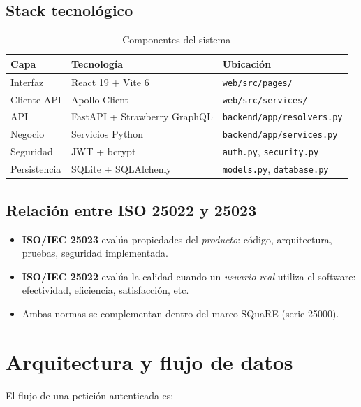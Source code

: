 \documentclass[11pt,a4paper]{article}
\begin{document}
\subsection{Stack tecnológico}
\begin{table}[h]
  \centering
  \caption{Componentes del sistema}
  \begin{tabular}{@{}lll@{}}
    \toprule
    \textbf{Capa} & \textbf{Tecnología} & \textbf{Ubicación} \\
    \midrule
    Interfaz & React 19 + Vite 6 & \texttt{web/src/pages/} \\
    Cliente API & Apollo Client & \texttt{web/src/services/} \\
    API & FastAPI + Strawberry GraphQL & \texttt{backend/app/resolvers.py} \\
    Negocio & Servicios Python & \texttt{backend/app/services.py} \\
    Seguridad & JWT + bcrypt & \texttt{auth.py}, \texttt{security.py} \\
    Persistencia & SQLite + SQLAlchemy & \texttt{models.py}, \texttt{database.py} \\
    \bottomrule
  \end{tabular}
\end{table}

\subsection{Relación entre ISO 25022 y 25023}
\begin{itemize}[noitemsep]
  \item \textbf{ISO/IEC 25023} evalúa propiedades del \emph{producto}: código, arquitectura, pruebas, seguridad implementada.
  \item \textbf{ISO/IEC 25022} evalúa la calidad cuando un \emph{usuario real} utiliza el software: efectividad, eficiencia, satisfacción, etc.
  \item Ambas normas se complementan dentro del marco SQuaRE (serie 25000).
\end{itemize}

\section{Arquitectura y flujo de datos}

El flujo de una petición autenticada es:
\end{document}
